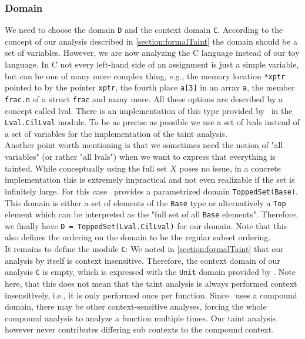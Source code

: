       \subsubsection{Domain}
        We need to choose the domain \texttt{D} and the context domain \texttt{C}. According to the concept of our analysis described in \autoref{section:formalTaint} the domain should be a set of variables. However, we are now analyzing the C language instead of our toy language. In C not every left-hand side of an assignment is just a simple variable, but can be one of many more complex thing, e.g., the memory location \texttt{*xptr} pointed to by the pointer \texttt{xptr}, the fourth place \texttt{a[3]} in an array \texttt{a}, the member \texttt{frac.n} of a struct \texttt{frac} and many more. All these options are described by a concept called \ac{lval}. There is an implementation of this type provided by \gob\ in the \texttt{Lval.CilLval} module. To be as precise as possible we use a set of \ac{lval}s instead of a set of variables for the implementation of the taint analysis.\\
        Another point worth mentioning is that we sometimes need the notion of "all variables" (or rather "all \ac{lval}s") when we want to express that everything is tainted. While conceptually using the full set $X$ poses no issue, in a concrete implementation this is extremely impractical and not even realizable if the set is infinitely large. For this case \gob\ provides a parametrized domain \texttt{ToppedSet(Base)}. This domain is either a set of elements of the \texttt{Base} type or alternatively a \texttt{Top} element which can be interpreted as the "full set of all \texttt{Base} elements". Therefore, we finally have \texttt{D = ToppedSet(Lval.CilLval)} for our domain. Note that this also defines the ordering on the domain to be the regular subset ordering.\\
        It remains to define the module \texttt{C}: We noted in \autoref{section:formalTaint} that our analysis by itself is context insensitive. Therefore, the context domain of our analysis \texttt{C} is empty, which is expressed with the \texttt{Unit} domain provided by \gob. Note here, that this does not mean that the taint analysis is always performed context insensitively, i.e., it is only performed once per function. Since \gob\ uses a compound domain, there may be other context-sensitive analyses, forcing the whole compound analysis to analyze a function multiple times. Our taint analysis however never contributes differing sub contexts to the compound context.

